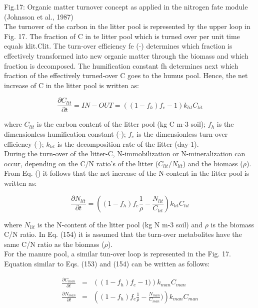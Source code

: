 Fig.17: Organic matter turnover concept as applied in the nitrogen fate module (Johnsson et al., 1987)\\

The turnover of the carbon in the litter pool is represented by the upper loop in Fig. 17. The fraction of C in te litter pool which is turned over per unit time equals klit.Clit. The turn-over efficiency fe (-) determines which fraction is effectively transformed into new organic matter through the biomass and which fraction is decomposed. The humification constant fh determines next which fraction of the effectively turned-over C goes to the humus pool. Hence, the net increase of C in the litter pool is written as:

\begin{equation}
\frac{\partial C_{lit}}{\partial t} = IN - OUT = \left((1-f_h)f_e-1\right)k_{lit}C_{lit}
\end{equation}

where $C_{lit}$ is the carbon content of the litter pool (kg C m-3 soil); $f_h$ is the dimensionless humification constant (-); $f_e$ is the dimensionless turn-over efficiency (-); $k_{lit}$ is the decomposition rate of the litter (day-1).\\

During the turn-over of the litter-C, N-immobilization or N-mineralization can occur, depending on the C/N ratio's of the litter ($C_{lit}/N_{lit}$) and the biomass ($\rho$). From Eq. () it follows that the net increase of the N-content in the litter pool is written as:

\begin{equation}
\frac{\partial N_{lit}}{\partial t} = \left((1-f_h)f_e \frac{1}{\rho}-\frac{N_{lit}}{C_{lit}}\right)k_{lit}C_{lit}
\end{equation}

where $N_{lit}$ is the N-content of the litter pool (kg N m-3 soil) and $\rho$ is the biomass C/N ratio. In Eq. (154) it is assumed that the turn-over metabolites have the same C/N ratio as the biomass ($\rho$).\\

For the manure pool, a similar tun-over loop is represented in the Fig. 17. Equation similar to Eqs. (153) and (154) can be written as follows:

\begin{eqnarray}
\frac{\partial C_{man}}{\partial t} &=& \left((1-f_h)f_e-1)\right)k_{man}C_{man}\\
\frac{\partial N_{man}}{\partial t} &=& \left((1-f_h)f_e\frac{1}{\rho}-\frac{N_{man}}{C_{man}})\right)k_{man}C_{man}
\end{eqnarray}


